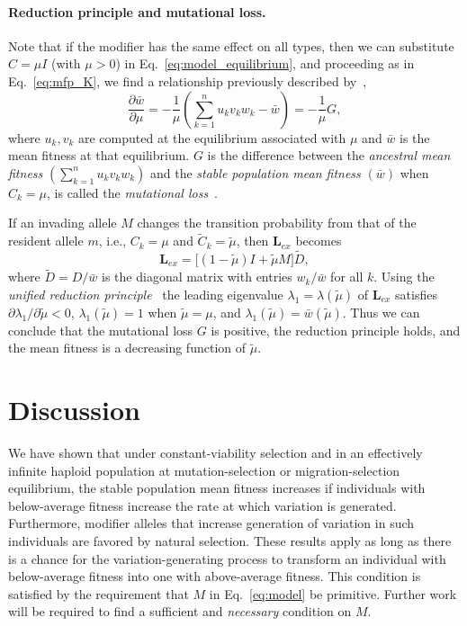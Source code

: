 \documentclass[12pt, twocolumn]{extarticle}
\newcommand{\cl}{\mathbf{L}}
\begin{document}
\paragraph*{Reduction principle and mutational loss.}

Note that if the modifier has the same effect on all types,
then we can substitute $C = \mu I$ (with $\mu > 0$) in Eq.~\ref{eq:model_equilibrium}, and proceeding as in Eq.~\ref{eq:mfp_K}, we find a relationship previously described by~\citet[eq.~24]{Hermisson2002},
\begin{equation}\label{eq:mutational_loss}
\frac{\partial {\bar{w}}}{\partial \mu} = 
-\frac{1}{\mu}\left(\sum_{k=1}^{n}  u_k  v_k w_k - {\bar{w}} \right) = -\frac{1}{\mu} G,
\end{equation}
where $u_k,v_k$ are computed at the equilibrium associated with $\mu$ and $\bar w$ is the mean fitness at that equilibrium. $G$ is the difference between the \emph{ancestral mean fitness} $(\sum_{k=1}^{n}  u_k  v_k w_k)$ and the \emph{stable population mean fitness} $({\bar{w}})$ when $C_k=\mu$, is  called the \emph{mutational loss}~\citep{Hermisson2002}.

If an invading  allele $M$ changes the transition probability from that of the resident allele $m$, i.e., $C_k=\mu$ and $\tilde C_k=\tilde\mu$, then $\cl_{ex}$ becomes
\begin{equation} \label{eq:Lex_mu}
\cl_{ex} = \bigl[(1 - \tilde\mu)I + \tilde\mu M\bigr] \tilde{D},
\end{equation} 
where $\tilde{D} =D/{\bar{w}}$ is  the diagonal matrix with entries $w_k/{\bar{w}}$ for all $k$.
Using the \emph{unified reduction principle}~\citep{Altenberg2017} the leading eigenvalue $\lambda_1=\lambda(\tilde\mu)$ of $\cl_{ex}$ satisfies $\partial\lambda_1/\partial\tilde\mu<0$, $\lambda_1(\tilde\mu)=1$ when $\tilde\mu=\mu$, and $\lambda_1(\tilde\mu)=\bar w(\tilde\mu)$. Thus we can conclude that the mutational loss $G$ is positive, the reduction principle holds, and the mean fitness is a decreasing function of $\tilde\mu$.

\section*{Discussion}

We have shown that under constant-viability selection and in an effectively infinite haploid population at mutation-selection or migration-selection equilibrium, the stable population mean fitness increases if individuals with below-average fitness increase the rate at which variation is generated. Furthermore, modifier alleles that  increase generation of variation in such individuals are favored by natural selection.
These results apply as long as there is a chance for the variation-generating process to transform an individual with below-average fitness into one with above-average fitness.
This condition is satisfied by the requirement that $M$ in Eq.~\ref{eq:model} be primitive. Further work will be required to find a sufficient and \emph{necessary} condition on $M$.
\end{document}
